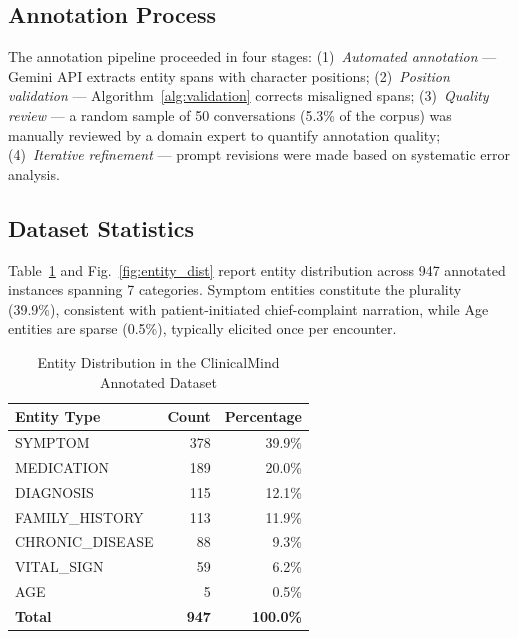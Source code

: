 \documentclass[conference]{IEEEtran}
\begin{document}
\subsection{Annotation Process}

The annotation pipeline proceeded in four stages: (1)~\emph{Automated
annotation} — Gemini API extracts entity spans with character positions;
(2)~\emph{Position validation} — Algorithm~\ref{alg:validation} corrects
misaligned spans; (3)~\emph{Quality review} — a random sample of 50
conversations (5.3\% of the corpus) was manually reviewed by a domain expert
to quantify annotation quality; (4)~\emph{Iterative refinement} — prompt
revisions were made based on systematic error analysis.

\subsection{Dataset Statistics}

Table~\ref{tab:entity_dist} and Fig.~\ref{fig:entity_dist} report entity
distribution across 947 annotated instances spanning 7 categories. Symptom
entities constitute the plurality (39.9\%), consistent with patient-initiated
chief-complaint narration, while Age entities are sparse (0.5\%), typically
elicited once per encounter.

\begin{table}[t]
\centering
\caption{Entity Distribution in the ClinicalMind Annotated Dataset}
\label{tab:entity_dist}
\begin{tabular}{lrr}
\toprule
\textbf{Entity Type} & \textbf{Count} & \textbf{Percentage} \\
\midrule
SYMPTOM          & 378 & 39.9\% \\
MEDICATION       & 189 & 20.0\% \\
DIAGNOSIS        & 115 & 12.1\% \\
FAMILY\_HISTORY  & 113 & 11.9\% \\
CHRONIC\_DISEASE &  88 &  9.3\% \\
VITAL\_SIGN      &  59 &  6.2\% \\
AGE              &   5 &  0.5\% \\
\midrule
\textbf{Total}   & \textbf{947} & \textbf{100.0\%} \\
\bottomrule
\end{tabular}
\end{table}
\end{document}
